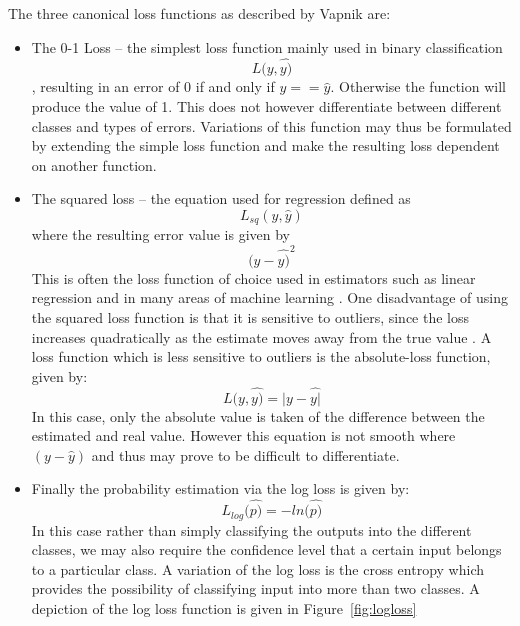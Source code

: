The three canonical loss functions as described by Vapnik \citep{vapnik1998statistical} are:
\begin{itemize} \item The 0-1 Loss – the simplest loss function mainly used in binary classification \begin{equation} L(y,\hat{y)} \end{equation}, resulting in an error of 0 if and only if $y == \hat{y}$. Otherwise the function will produce the value of 1. This does not however differentiate between different classes and types of errors. Variations of this function may thus be formulated by extending the simple loss function and make the resulting loss dependent on another function.
\item The squared loss – the equation used for regression defined as \begin{equation} L_{sq}(y,\hat{y}) \end{equation}  where the resulting error value is given by \begin{equation} (y-\hat{y)}^{2} \end{equation} This is often the loss function of choice used in estimators such as linear regression and in many areas of machine learning \citep {Davidson-Pilon:2015:BMH:2851115}. One disadvantage of using the squared loss function is that it is sensitive to outliers, since the loss increases quadratically as the estimate moves away from the true value \citep {Davidson-Pilon:2015:BMH:2851115}. A loss function which is less sensitive to outliers is the absolute-loss function, given by: \begin{equation} L(y,\hat{y)}=|y-\hat{y|}\end{equation} In this case, only the absolute value is taken of the difference between the estimated and real value. However this equation is not smooth where $(y-\hat{y})$ and thus may prove to be difficult to differentiate. 
\item Finally the probability estimation via the log loss is given by: \begin{equation} L_{log}(\hat{p)}=-ln(\hat{p)} \end{equation} In this case rather than simply classifying the outputs into the different classes, we may also require the confidence level that a certain input belongs to a particular class. A variation of the log loss is the cross entropy which provides the possibility of classifying input into more than two classes. A depiction of the log loss function is given in Figure~\ref{fig:logloss}
\end{itemize}

